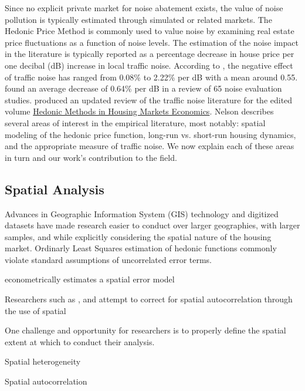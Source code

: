 \documentclass{article}\usepackage{graphicx, color}
\begin{document}
Since no explicit private market for noise abatement exists, the value of noise pollution is typically estimated through simulated or related markets. The Hedonic Price Method is commonly used to value noise by examining real estate price fluctuations as a function of noise levels. The estimation of the noise impact in the literature is typically reported as a percentage decrease in house price per one decibal (dB) increase in local traffic noise. According to \citet{Batemen2001}, the negative effect of traffic noise has ranged from 0.08\% to 2.22\% per dB with a mean around 0.55. \citet{Navrud2002} found an average decrease of 0.64\% per dB in a review of 65 noise evaluation studies. \citet{Nelson2008} produced an updated review of the traffic noise literature for the edited volume \underline{Hedonic Methods in Housing Markets Economics}. Nelson describes several areas of interest in the empirical literature, most notably: spatial modeling of the hedonic price function, long-run vs. short-run housing dynamics, and the appropriate measure of traffic noise. We now explain each of these areas in turn and our work's contribution to the field.

\subsection{Spatial Analysis}
Advances in Geographic Information System (GIS) technology and digitized datasets have made research easier to conduct over larger geographies, with larger samples, and while explicitly considering the spatial nature of the housing market. Ordinarly Least Squares estimation of hedonic functions commonly violate standard assumptions of uncorrelated error terms. 


\citet{Theebe2004} econometrically estimates a spatial error model

Researchers such as , and \citet{Andersson2010} attempt to correct for spatial autocorrelation through the use of spatial



One challenge and opportunity for researchers is to properly define the spatial extent at which to conduct their analysis. 

Spatial heterogeneity

Spatial autocorrelation
\end{document}
